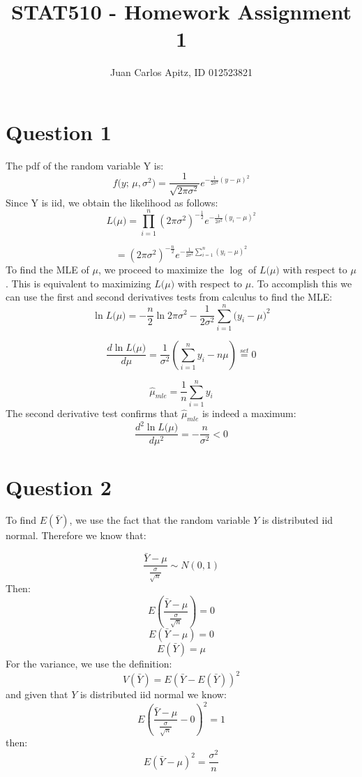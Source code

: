 \documentclass[12pt,a4paper]{article}
\author{Juan Carlos Apitz, ID 012523821}
\title{STAT510 - Homework Assignment 1}
\begin{document}
\maketitle
\clearpage
\newcommand{\normalpdf}[1]{f \big( #1 \text{; } \mu,\sigma^2 \big) = \frac{1}{\sqrt{2 \pi \sigma^2}} e^{-\frac{1}{2 \sigma^2}(#1-\mu)^2}}

\newcommand{\expectedvalue}[1]{E \left(#1\right)}

\section*{Question 1}
The pdf of the random variable Y is:
\[
\normalpdf{y}
\]
Since Y is iid, we obtain the likelihood as follows:
\[
L\big(\mu\big) = \prod_{i=1}^n \left(2 \pi \sigma^2\right)^{-\frac{1}{2}} e^{-\frac{1}{2 \sigma^2}(y_i-\mu)^2}
\]

\[
= \left(2 \pi \sigma^2\right)^{-\frac{n}{2}} e^{-\frac{1}{2 \sigma^2}\sum_{i=1}^n(y_i-\mu)^2}
\]
To find the MLE of $\mu$, we proceed to maximize the $\log$ of $L\big(\mu\big)$ with respect to $\mu$. This is equivalent to maximizing $L\big(\mu\big)$ with respect to $\mu$. To accomplish this we can use the first and second derivatives tests from calculus to find the MLE:
\[
\ln{L\big(\mu\big)}=-\frac{n}{2}\ln{2 \pi \sigma^2}-\frac{1}{2 \sigma^2}\sum_{i=1}^n \big(y_i - \mu\big)^2
\]

\[
\frac{d \ln{L\big(\mu\big)}}{d\mu}=\frac{1}{\sigma^2}\left(\sum_{i=1}^n y_i - n \mu \right)\overset{set}{=}0
\]

\[
\hat{\mu}_{mle}=\frac{1}{n}\sum_{i=1}^n y_i
\]
The second derivative test confirms that $\hat{\mu}_{mle}$ is indeed a maximum:
\[
\frac{d^2 \ln{L\big(\mu\big)}}{d\mu^2}=-\frac{n}{\sigma^2}<0
\]
\clearpage
\section*{Question 2}
To find $\expectedvalue{\bar{Y}}$, we use the fact that the random variable $Y$ is distributed iid normal. Therefore we know that:

\[
\dfrac{\bar{Y}-\mu}{\frac{\sigma}{\sqrt{n}}} \sim N(0,1)
\]
Then:
\[
\expectedvalue{\dfrac{\bar{Y}-\mu}{\frac{\sigma}{\sqrt{n}}}}=0
\]
\[
\expectedvalue{\bar{Y}-\mu}=0
\]
\[
\expectedvalue{\bar{Y}}=\mu
\]
For the variance, we use the definition:
\[
V\left(\bar{Y}\right)=\expectedvalue{\bar{Y}-\expectedvalue{\bar{Y}}}^2
\]
and given that $Y$ is distributed iid normal we know:
\[
\expectedvalue{\dfrac{\bar{Y}-\mu}{\frac{\sigma}{\sqrt{n}}}-0}^2=1
\]
then:
\[
\expectedvalue{\bar{Y}-\mu}^2 = \dfrac{\sigma^2}{n}
\]
\end{document}
